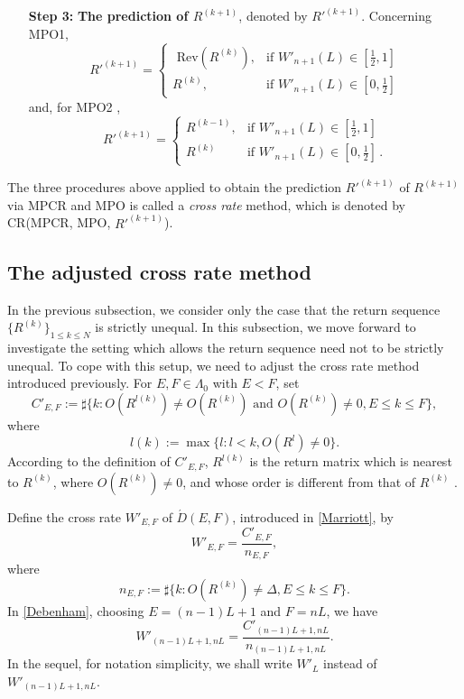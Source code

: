 \documentclass[11pt]{article}
\numberwithin{equation}{section}
\begin{document}
\begin{itemize}
\item[{\bf Step 3:}] {\bf The prediction of $R^{(k+1)}$}, denoted by $R'^{(k+1)}$. Concerning  MPO1, 
\begin{equation*}
R'^{(k+1)}=\begin{cases}
\mbox{ Rev}(R^{(k)}), &\text{if }W'_{n+1}(L)\in [\frac{1}{2},1]\\
R^{(k)}, &\text{if }W'_{n+1}(L)\in [0,\frac{1}{2}]
\end{cases}
\end{equation*}
and,  for MPO2 , 
\begin{equation*}
R'^{(k+1)}=\begin{cases}
R^{(k-1)}, &\text{if }W'_{n+1}(L)\in [\frac{1}{2},1]\\
R^{(k)} &\text{if }W'_{n+1}(L)\in [0,\frac{1}{2}]\, .
\end{cases}
\end{equation*}
 
\end{itemize}

The three procedures above applied to obtain the prediction $R'^{(k+1)}$ of $R^{(k+1)}$  via MPCR and MPO  is called a {\it cross rate} method, which is denoted by CR(MPCR, MPO, $R'^{(k+1)}$).

\subsection{The adjusted cross rate method}
In the previous subsection, we consider only the case that the return sequence $\{R^{(k)}\}_{1\le k\le N}$  is strictly unequal. In this subsection, we move forward to investigate the setting which 
allows the return sequence need not to be strictly unequal. To cope with this setup, we need to  adjust the cross rate method introduced previously.  For $E,F\in \Lambda_0$ with $E<F$, set 
\begin{equation*}
C'_{E,F}:=\sharp \{k:O(R^{l(k)})\neq O(R^{(k)})\text{ and }  O(R^{(k)})\neq 0, E\leqslant k\leqslant F\},
\end{equation*}
where
\begin{equation*}
l(k):=\max\{l:l<k,O(R^l)\neq 0\}.
\end{equation*}
According to the definition of $C'_{E,F}$, $R^{l(k)}$ is the return matrix which is nearest to $R^{(k)}$, where $O(R^{(k)})\neq 0$,  and whose order is different from  that of $R^{(k)}$ . 

Define  the  cross rate $W'_{E,F} $ of $ \acute{D}(E,F)$, introduced in \eqref{Marriott}, by 
\begin{equation}\label{Debenham}
W'_{E,F} =\frac{C'_{E,F}}{n_{E,F}},
\end{equation}
where
\begin{equation*}
n_{E,F}:=\sharp\{k:O(R^{(k)})\neq \Delta, E\leqslant k\leqslant F\}.
\end{equation*}
In \eqref{Debenham}, choosing $E=(n-1)L+1$ and $F=nL$, we have 
\begin{equation*} 
W'_{(n-1)L+1,nL} =\frac{C'_{(n-1)L+1,nL}}{n_{(n-1)L+1,nL}}. 
\end{equation*}
In the sequel, for notation simplicity, we shall write $ W'_{L} $ instead of $W'_{(n-1)L+1,nL} $. 
\end{document}

